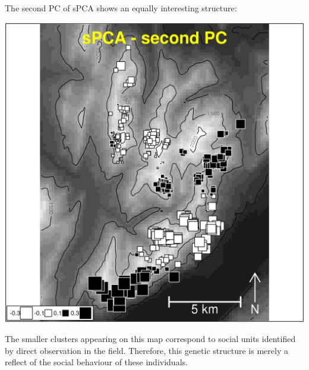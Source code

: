 \documentclass{article}
\begin{document}
The second PC of sPCA shows an equally interesting structure:
\begin{Schunk}
\end{Schunk}
\includegraphics{figs/spca-051}

\noindent The smaller clusters appearing on this map correspond to social units identified by
direct observation in the field.
Therefore, this genetic structure is merely a reflect of the social behaviour of these individuals.
\\
\end{document}
